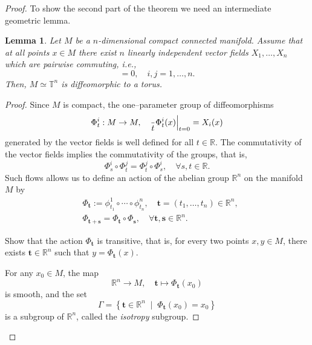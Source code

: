 \documentclass[english,fontsize=11pt,paper=a5,oneside]{scrbook}
\newcommand{\R}{\mathbb{R}}
\newcommand{\T}{\mathbb{T}}
\let\d\relax
\DeclareMathOperator{\d}{d}
\newtheorem{lemma}[theorem]{Lemma}
\theoremstyle{definition}
\newenvironment{exercise}
  {\pushQED{\qed}\renewcommand{\qedsymbol}{$\maltese$}\exercisex}
  {\popQED\endexercisex}
\begin{document}
\begin{proof}
    To show the second part of the theorem we need an intermediate geometric lemma.
    \begin{lemma}\label{lemma:isotn}
        Let $M$ be a $n$-dimensional compact connected manifold.
        Assume that at all points $x\in M$ there exist $n$ linearly independent vector fields $X_1, \ldots, X_n$ which are pairwise commuting, i.e.,
        \begin{equation}
            [X_i, X_j] = 0, \quad i,j = 1,\ldots,n.
        \end{equation}
        Then, $M \simeq \T^n$ is diffeomorphic to a torus.
    \end{lemma}
    \begin{proof}
        Since $M$ is compact, the one--parameter group of diffeomorphisms
        \begin{equation}
            \Phi_t^i: M \to M, \quad \frac{\d}{\d t} \Phi_t^i(x)\Big|_{t=0} = X_i(x)
        \end{equation}
        generated by the vector fields is well defined for all $t\in\R$.
        The commutativity of the vector fields implies the commutativity of the groups, that is,
        \begin{equation}
            \Phi^i_s \circ \Phi^j_t = \Phi^j_t \circ \Phi^i_s, \quad \forall s,t\in\R.
        \end{equation}
        Such flows allows us to define an action of the abelian group $\R^n$ on the manifold $M$ by
        \begin{align}
            & \Phi_{\bm{t}} := \phi_{t_1}^1 \circ \cdots \circ \phi_{t_n}^n, \quad \bm{t} = (t_1, \ldots, t_n)\in \R^n,\\
            & \Phi_{\bm t + \bm s} = \Phi_{\bm t} \circ \Phi_{\bm s}, \quad \forall \bm t, \bm s \in \R^n.
        \end{align}

        \begin{exercise}
            Show that the action $\Phi_{\bm t}$ is transitive, that is, for every two points $x, y\in M$, there exists $\bm t\in\R^n$ such that $y = \Phi_{\bm t} (x)$.
        \end{exercise}

        For any $x_0 \in M$, the map
        \begin{equation}\label{eq:diffeoRnM}
            \R^n \to M, \quad \bm t \mapsto \Phi_{\bm t}(x_0)
        \end{equation}
        is smooth, and the set
        \begin{equation}
            \Gamma = \left\{ \bm t \in \R^n \;\mid\; \Phi_{\bm t}(x_0) = x_0\right\}
        \end{equation}
        is a subgroup of $\R^n$, called the \emph{isotropy} subgroup.


\end{proof}
\end{proof}
\end{document}
